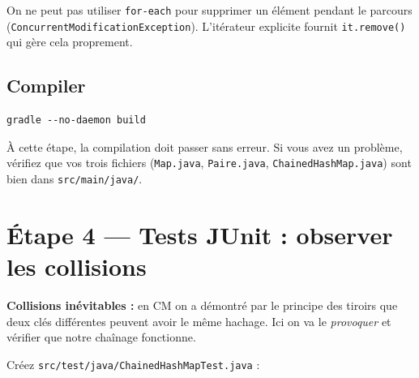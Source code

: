 \documentclass[11pt,a4paper]{article}
\begin{document}
\begin{infobox}
On ne peut pas utiliser \texttt{for-each} pour supprimer un élément pendant le parcours (\texttt{ConcurrentModificationException}). L'itérateur explicite fournit \texttt{it.remove()} qui gère cela proprement.
\end{infobox}

\subsection{Compiler}

\begin{lstlisting}[style=bash]
gradle --no-daemon build
\end{lstlisting}

À cette étape, la compilation doit passer sans erreur. Si vous avez un problème, vérifiez que vos trois fichiers (\texttt{Map.java}, \texttt{Paire.java}, \texttt{ChainedHashMap.java}) sont bien dans \texttt{src/main/java/}.

\section{Étape 4 --- Tests JUnit : observer les collisions}

\begin{lienbox}[Ce qu'on matérialise du CM]
\textbf{Collisions inévitables :} en CM on a démontré par le principe des tiroirs que deux clés différentes peuvent avoir le même hachage. Ici on va le \emph{provoquer} et vérifier que notre chaînage fonctionne.
\end{lienbox}

Créez \texttt{src/test/java/ChainedHashMapTest.java} :
\end{document}
